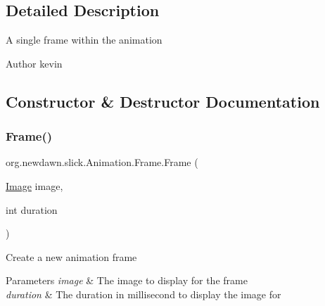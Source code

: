 \subsection{Detailed Description}
A single frame within the animation

\begin{DoxyAuthor}{Author}
kevin 
\end{DoxyAuthor}


\subsection{Constructor \& Destructor Documentation}
\mbox{\label{classorg_1_1newdawn_1_1slick_1_1_animation_1_1_frame_aeafe2cb473eec2fed2d001e5b1a74737}} 
\subsubsection{\texorpdfstring{Frame()}{Frame()}\hspace{0.1cm}{\footnotesize\ttfamily [1/2]}}
{\footnotesize\ttfamily org.\+newdawn.\+slick.\+Animation.\+Frame.\+Frame (\begin{DoxyParamCaption}\item[{\mbox{\hyperlink{classorg_1_1newdawn_1_1slick_1_1_image}{Image}}}]{image,  }\item[{int}]{duration }\end{DoxyParamCaption})\hspace{0.3cm}{\ttfamily [inline]}}

Create a new animation frame


\begin{DoxyParams}{Parameters}
{\em image} & The image to display for the frame \\
\hline
{\em duration} & The duration in millisecond to display the image for \\
\hline
\end{DoxyParams}

